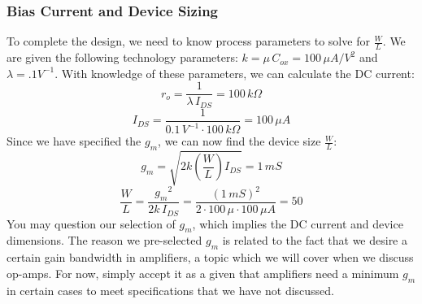 \subsubsection{Bias Current and Device Sizing}
To complete the design, we need to know process parameters to solve for $\frac{W}{L}$.  We are given the following technology parameters: $k = \mu\,C_{ox} = 100\,\mu A/V^2$ and $\lambda = .1V^{-1}$.  With knowledge of these parameters, we can calculate the DC current:
    \begin{equation}
        r_o = \frac{1}{\lambda\,I_{DS}} = \boxed{100\,k\Omega}
    \end{equation}
    \begin{equation}
        I_{DS} = \frac{1}{0.1\,V^{-1} \cdot 100\,k\Omega} = \boxed{100\,\mu A}
    \end{equation}
Since we have specified the $g_m$, we can now find the device size $\frac{W}{L}$:
    \begin{equation} 
        g_m = \sqrt{2k\left(\frac{W}{L}\right) {I_{DS}}} = \boxed{1\,mS}
    \end{equation}
    \begin{equation} 
        \frac{W}{L} = \frac{{g_m}^2}{2k\,I_{DS}}
        = \frac{{(1\,mS)}^2}{2 \cdot 100\,\mu \cdot 100\,\mu A} = \boxed{50}
    \end{equation}
You may question our selection of $g_m$, which implies the DC current and device dimensions.  The reason we pre-selected $g_m$ is related to the fact that we desire a certain gain bandwidth in amplifiers, a topic which we will cover when we discuss op-amps.  For now, simply accept it as a given that amplifiers need a minimum $g_m$ in certain cases to meet specifications that we have not discussed.
